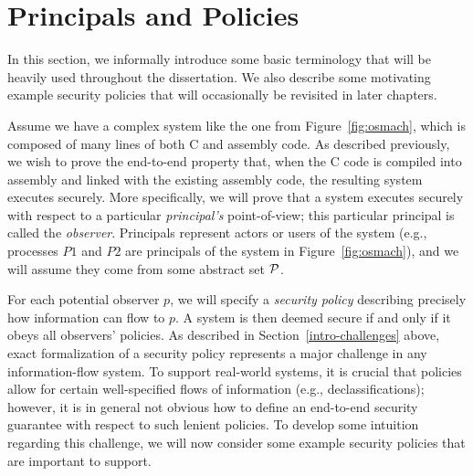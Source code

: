 \section{Principals and Policies}
\label{intro-policies}

In this section, we informally introduce some basic terminology that 
will be heavily used throughout the dissertation. We also describe
some motivating example security policies that will occasionally
be revisited in later chapters.

Assume we have a complex system like the one from
Figure~\ref{fig:osmach}, which is composed of many lines of both C and assembly code.
As described previously, we wish to prove the end-to-end property that, when the 
C code is compiled into assembly and linked with the existing assembly code, the resulting 
system executes securely. More specifically, we will prove that a system executes
securely with respect to a particular \emph{principal's} point-of-view; this particular
principal is called the \emph{observer}. Principals
represent actors or users of the system (e.g., processes $P1$ and $P2$ are principals
of the system in Figure~\ref{fig:osmach}), and we will assume they come from some
abstract set $\mathcal{P}{}$.

For each potential observer $p$, we will specify a \emph{security policy} describing 
precisely how information can flow to $p$. A system is then deemed secure if and only if 
it obeys all observers' policies. As described in Section~\ref{intro-challenges}
above, exact formalization of a security policy 
represents a major challenge in any information-flow system. To support real-world
systems, it is crucial that policies allow for certain well-specified flows of 
information (e.g., declassifications); however, it is in general not obvious how
to define an end-to-end security guarantee with respect to such lenient policies.
To develop some intuition regarding this challenge, we will now consider some
example security policies that are important to support.

